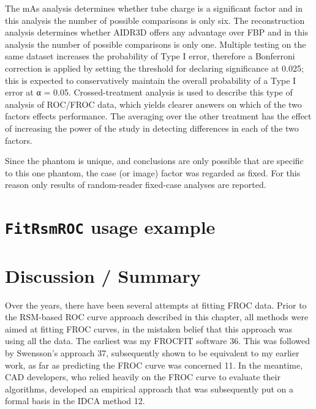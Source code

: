 \documentclass[
]{book}
\begin{document}
The mAs analysis determines whether tube charge is a significant factor and in this analysis the number of possible comparisons is only six. The reconstruction analysis determines whether AIDR3D offers any advantage over FBP and in this analysis the number of possible comparisons is only one. Multiple testing on the same dataset increases the probability of Type I error, therefore a Bonferroni correction is applied by setting the threshold for declaring significance at 0.025; this is expected to conservatively maintain the overall probability of a Type I error at α = 0.05. Crossed-treatment analysis is used to describe this type of analysis of ROC/FROC data, which yields clearer answers on which of the two factors effects performance. The averaging over the other treatment has the effect of increasing the power of the study in detecting differences in each of the two factors.

Since the phantom is unique, and conclusions are only possible that are specific to this one phantom, the case (or image) factor was regarded as fixed. For this reason only results of random-reader fixed-case analyses are reported.

\hypertarget{froc-sample-size-fitrsmroc-usage-example}{%
\section{\texorpdfstring{\texttt{FitRsmROC} usage example}{FitRsmROC usage example}}\label{froc-sample-size-fitrsmroc-usage-example}}

\hypertarget{froc-sample-size-discussion-summary}{%
\section{Discussion / Summary}\label{froc-sample-size-discussion-summary}}

Over the years, there have been several attempts at fitting FROC data. Prior to the RSM-based ROC curve approach described in this chapter, all methods were aimed at fitting FROC curves, in the mistaken belief that this approach was using all the data. The earliest was my FROCFIT software 36. This was followed by Swensson's approach 37, subsequently shown to be equivalent to my earlier work, as far as predicting the FROC curve was concerned 11. In the meantime, CAD developers, who relied heavily on the FROC curve to evaluate their algorithms, developed an empirical approach that was subsequently put on a formal basis in the IDCA method 12.
\end{document}
